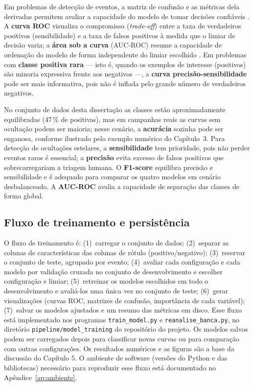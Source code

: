 Em problemas de detecção de eventos, a matriz de confusão e as métricas dela derivadas permitem avaliar a capacidade do modelo de tomar decisões confiáveis \citep{Cazeneuve2023}. A \textbf{curva ROC} visualiza o compromisso (\textit{trade-off}) entre a taxa de verdadeiros positivos (sensibilidade) e a taxa de falsos positivos à medida que o limiar de decisão varia; a \textbf{área sob a curva} (AUC-ROC) resume a capacidade de ordenação do modelo de forma independente do limiar escolhido \citep{AUC-curve}. Em problemas com \textbf{classe positiva rara} --- isto é, quando os exemplos de interesse (positivos) são minoria expressiva frente aos negativos ---, a \textbf{curva precisão-sensibilidade} pode ser mais informativa, pois não é inflada pelo grande número de verdadeiros negativos.

No conjunto de dados desta dissertação as classes estão aproximadamente equilibradas (47\,\% de positivas), mas em campanhas reais as curvas sem ocultação podem ser maioria; nesse cenário, a \textbf{acurácia} sozinha pode ser enganosa, conforme ilustrado pelo exemplo numérico do Capítulo~3. Para detecção de ocultações estelares, a \textbf{sensibilidade} tem prioridade, pois não perder eventos raros é essencial; a \textbf{precisão} evita excesso de falsos positivos que sobrecarregariam a triagem humana. O \textbf{F1-score} equilibra precisão e sensibilidade e é adequado para comparar os quatro modelos em cenário desbalanceado. A \textbf{AUC-ROC} avalia a capacidade de separação das classes de forma global.

\subsection{Fluxo de treinamento e persistência}

O fluxo de treinamento é: (1)~carregar o conjunto de dados; (2)~separar as colunas de características das colunas de rótulo (positivo/negativo); (3)~reservar o conjunto de teste, agrupado por evento; (4)~avaliar cada configuração e cada modelo por validação cruzada no conjunto de desenvolvimento e escolher configuração e limiar; (5)~retreinar os modelos escolhidos em todo o desenvolvimento e avaliá-los uma única vez no conjunto de teste; (6)~gerar visualizações (curvas ROC, matrizes de confusão, importância de cada variável); (7)~salvar os modelos ajustados e um resumo das métricas em disco. Esse fluxo está implementado nos programas \texttt{train\_model.py} e \texttt{reanalise\_banca.py}, no diretório \texttt{pipeline/model\_training} do repositório do projeto. Os modelos salvos podem ser carregados depois para classificar novas curvas ou para comparação com outras configurações. Os resultados numéricos e as figuras são a base da discussão do Capítulo 5. O ambiente de software (versões do Python e das bibliotecas) necessário para reproduzir esse fluxo está documentado no Apêndice~\ref{ap:ambiente}.

